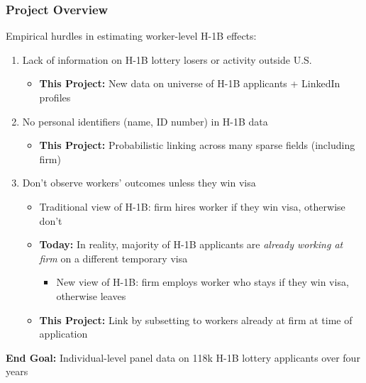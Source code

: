\documentclass[xcolor=dvipsnames, compress, 12pt, aspectratio=169, handout]{beamer}
\begin{document}
\begin{frame}
    \frametitle{Project Overview}
    Empirical hurdles in estimating worker-level H-1B effects:
    \vspace{2mm}
    \begin{enumerate}
        \item Lack of information on H-1B lottery losers or activity outside U.S. 
        \begin{itemize}
            \item \textbf{This Project:} New data on universe of H-1B applicants + LinkedIn profiles
        \end{itemize}
        \vspace{2mm}
        \item No personal identifiers (name, ID number) in H-1B data 
        \begin{itemize}
            \item \textbf{This Project:} Probabilistic linking across many sparse fields (including firm) 
        \end{itemize}
        \vspace{2mm}
        \item Don't observe workers' outcomes unless they win visa 
        \begin{itemize}
            \item Traditional view of H-1B: firm hires worker if they win visa, otherwise don't 
            \vspace{2mm}
            \item \textbf{Today:} In reality, majority of H-1B applicants are \textit{already working at firm} on a different temporary visa
            \begin{itemize}
                \item New view of H-1B: firm employs worker who stays if they win visa, otherwise leaves 
            \end{itemize}
            \vspace{2mm}
            \item \textbf{This Project:} Link by subsetting to workers already at firm at time of application
        \end{itemize}
    \end{enumerate}
    \vspace{2mm}
    \textbf{End Goal:} Individual-level panel data on 118k H-1B lottery applicants over four years
\end{frame}
\end{document}

